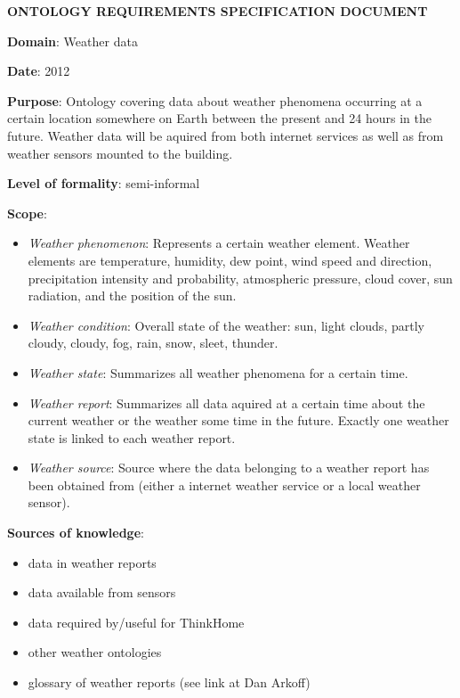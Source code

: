 \begin{framed}
\setlength{\parindent}{0pt}
\MakeUppercase{\textbf{Ontology requirements specification document}}


\textbf{Domain}: Weather data

\textbf{Date}: 2012 %

\textbf{Purpose}: Ontology covering data about weather phenomena occurring at a certain location somewhere on Earth between the present and 24 hours in the future. Weather data will be aquired from both internet services as well as from weather sensors mounted to the building.

\textbf{Level of formality}: semi-informal %

\textbf{Scope}:

\begin{itemize}
  \item \emph{Weather phenomenon}: Represents a certain weather element. Weather elements are temperature, humidity, dew point, wind speed and direction, precipitation intensity and probability, atmospheric pressure, cloud cover, sun radiation, and the position of the sun.
  \item \emph{Weather condition}: Overall state of the weather: sun, light clouds, partly cloudy, cloudy, fog, rain, snow, sleet, thunder.
  \item \emph{Weather state}: Summarizes all weather phenomena for a certain time. 
  \item \emph{Weather report}: Summarizes all data aquired at a certain time about the current weather or the weather some time in the future. Exactly one weather state is linked to each weather report.
  \item \emph{Weather source}: Source where the data belonging to a weather report has been obtained from (either a internet weather service or a local weather sensor).
\end{itemize}

\textbf{Sources of knowledge}:
\begin{itemize}
  \item data in weather reports
  \item data available from sensors
  \item data required by/useful for ThinkHome
  \item other weather ontologies
  \item glossary of weather reports (see link at Dan Arkoff)
\end{itemize}

\end{framed}

